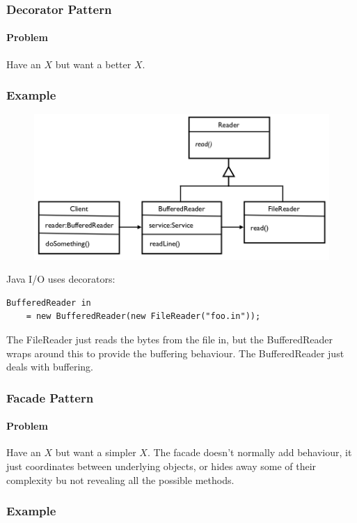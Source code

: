 \documentclass[twocolumn,english]{article}
\begin{document}
\subsubsection{Decorator Pattern}


\paragraph{Problem}

Have an $X$ but want a better $X$.


\subsubsection*{Example}

\begin{figure}[H]
\centering{}\includegraphics[width=0.6\columnwidth]{img/decorator} 
\end{figure}

Java I/O uses decorators:
\begin{lstlisting}
BufferedReader in 
    = new BufferedReader(new FileReader("foo.in"));
\end{lstlisting}
The FileReader just reads the bytes from the file in, but the BufferedReader wraps around this to provide the buffering behaviour. The BufferedReader just deals with buffering.



\subsubsection{Facade Pattern}


\paragraph{Problem}

Have an $X$ but want a simpler $X$. The facade doesn't normally add behaviour, it just coordinates between underlying objects, or hides away some of their complexity bu not revealing all the possible methods.


\subsubsection*{Example}
\end{document}
